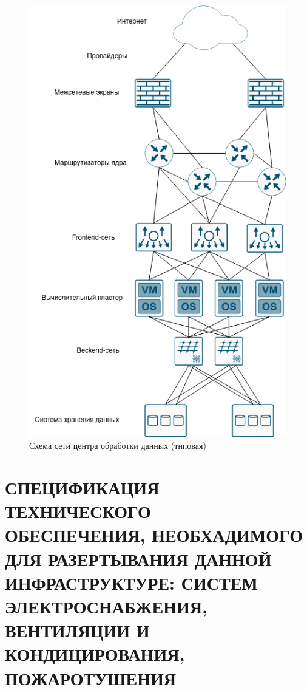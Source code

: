 \documentclass[14pt, a4paper]{extarticle}
\begin{document}
\begin{figure}[H]
\includegraphics[scale=0.75]{server_network.png}
\caption{Схема сети центра обработки данных (типовая)\label{fig:server_network}}
\end{figure}


\section[СПЕЦИФИКАЦИЯ ТЕХНИЧЕСКОГО ОБЕСПЕЧЕНИЯ, \\НЕОБХАДИМОГО ДЛЯ РАЗЕРТЫВАНИЯ ДАННОЙ \\ИНФРАСТРУКТУРЕ: СИСТЕМ ЭЛЕКТРОСНАБЖЕНИЯ, ВЕНТИЛЯЦИИ И КОНДИЦИРОВАНИЯ, ПОЖАРОТУШЕНИЯ]{СПЕЦИФИКАЦИЯ ТЕХНИЧЕСКОГО \\ОБЕСПЕЧЕНИЯ, НЕОБХАДИМОГО \\ДЛЯ РАЗЕРТЫВАНИЯ ДАННОЙ \\ИНФРАСТРУКТУРЕ: СИСТЕМ \\ЭЛЕКТРОСНАБЖЕНИЯ, ВЕНТИЛЯЦИИ И КОНДИЦИРОВАНИЯ, ПОЖАРОТУШЕНИЯ}
\end{document}
